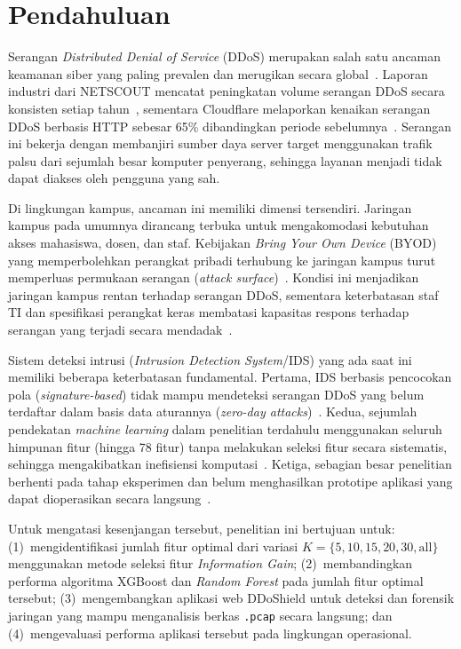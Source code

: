 \documentclass[conference,a4paper]{IEEEtran}
\begin{document}
\section{Pendahuluan}

Serangan \textit{Distributed Denial of Service} (DDoS) merupakan salah satu ancaman
keamanan siber yang paling prevalen dan merugikan secara global~\cite{ref_sahoo2020}. Laporan
industri dari NETSCOUT mencatat peningkatan volume serangan DDoS secara konsisten
setiap tahun~\cite{ref_netscout2023}, sementara Cloudflare melaporkan kenaikan serangan
DDoS berbasis HTTP sebesar 65\% dibandingkan periode sebelumnya~\cite{ref_cloudflare2023}. Serangan ini
bekerja dengan membanjiri sumber daya server target menggunakan trafik palsu dari
sejumlah besar komputer penyerang, sehingga layanan menjadi tidak dapat diakses oleh
pengguna yang sah.

Di lingkungan kampus, ancaman ini memiliki dimensi tersendiri. Jaringan kampus
pada umumnya dirancang terbuka untuk mengakomodasi kebutuhan akses mahasiswa, dosen, dan
staf. Kebijakan \textit{Bring Your Own Device} (BYOD) yang memperbolehkan perangkat
pribadi terhubung ke jaringan kampus turut memperluas permukaan serangan
(\textit{attack surface})~\cite{ref_byod}. Kondisi ini menjadikan jaringan kampus rentan
terhadap serangan DDoS, sementara keterbatasan staf TI dan spesifikasi perangkat keras
membatasi kapasitas respons terhadap serangan yang terjadi secara mendadak~\cite{ref_campus_sec}.

Sistem deteksi intrusi (\textit{Intrusion Detection System}/IDS) yang ada saat ini
memiliki beberapa keterbatasan fundamental. Pertama, IDS berbasis pencocokan pola
(\textit{signature-based}) tidak mampu mendeteksi serangan DDoS yang belum terdaftar
dalam basis data aturannya (\textit{zero-day attacks})~\cite{ref_ring2019}. Kedua, sejumlah
pendekatan \textit{machine learning} dalam penelitian terdahulu menggunakan seluruh himpunan fitur
(hingga 78 fitur) tanpa melakukan seleksi fitur secara sistematis, sehingga mengakibatkan
inefisiensi komputasi~\cite{ref_kasongo2020,ref_ullah2020}. Ketiga, sebagian besar penelitian
berhenti pada tahap eksperimen dan belum menghasilkan prototipe aplikasi yang dapat
dioperasikan secara langsung~\cite{ref_abdulganiyu2023}.

Untuk mengatasi kesenjangan tersebut, penelitian ini bertujuan untuk:
(1)~mengidentifikasi jumlah fitur optimal dari variasi $K = \{5, 10, 15, 20, 30, \text{all}\}$
menggunakan metode seleksi fitur \textit{Information Gain}; (2)~membandingkan performa algoritma
XGBoost dan \textit{Random Forest} pada jumlah fitur optimal tersebut; (3)~mengembangkan aplikasi web
DDoShield untuk deteksi dan forensik jaringan yang mampu menganalisis berkas \texttt{.pcap} secara langsung; dan (4)~mengevaluasi
performa aplikasi tersebut pada lingkungan operasional.
\end{document}
